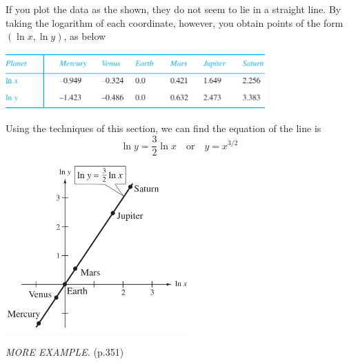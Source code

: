 \documentclass{article}
\newcommand\T{\textit}
\begin{document}
    If you plot the data as the shown, they do not seem to lie in a straight line. By taking the logarithm
    of each coordinate, however, you obtain points of the form $(\ln{x}, \ln{y})$, as below
    \begin{center}
        \includegraphics[width = 10cm]{images/planet2.png}
    \end{center}
    \begin{minipage}{0.4\linewidth}
    Using the techniques of this section, we can find the equation of the line is
    \[\ln{y} = \frac{3}{2} \ln{x} \quad \text{or} \quad y = x^{3/2} \]
    \end{minipage}
    \begin{minipage}{0.5\linewidth}
       \begin{flushright}
           \includegraphics[width = 7cm]{images/planet3.png}
       \end{flushright} 
    \end{minipage}



    \T{MORE EXAMPLE.} (p.351)

\end{document}
